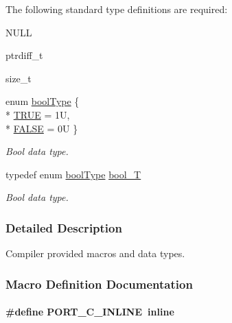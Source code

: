 The following standard type definitions are required\-:
\begin{DoxyItemize}
\item N\-U\-L\-L
\item ptrdiff\-\_\-t
\item size\-\_\-t 
\end{DoxyItemize}\begin{DoxyCompactItemize}
\item 
enum \hyperlink{group__template__compiler_ga05f6c3f21a0d28271ad754637673d8fa}{bool\-Type} \{ \\*
\hyperlink{group__template__compiler_gga05f6c3f21a0d28271ad754637673d8faaa82764c3079aea4e60c80e45befbb839}{T\-R\-U\-E} = 1\-U, 
\\*
\hyperlink{group__template__compiler_gga05f6c3f21a0d28271ad754637673d8faaa1e095cc966dbecf6a0d8aad75348d1a}{F\-A\-L\-S\-E} = 0\-U
 \}
\begin{DoxyCompactList}\small\item\em Bool data type. \end{DoxyCompactList}\item 
typedef enum \hyperlink{group__template__compiler_ga05f6c3f21a0d28271ad754637673d8fa}{bool\-Type} \hyperlink{group__template__compiler_ga74fbee312f9185efb602f89d21b53404}{bool\-\_\-\-T}
\begin{DoxyCompactList}\small\item\em Bool data type. \end{DoxyCompactList}\end{DoxyCompactItemize}


\subsubsection{Detailed Description}
Compiler provided macros and data types. 

\subsubsection{Macro Definition Documentation}
\hypertarget{group__template__compiler_ga87952d6e574c7f437503926e833ba345}{
\paragraph[{P\-O\-R\-T\-\_\-\-C\-\_\-\-I\-N\-L\-I\-N\-E}]{\setlength{\rightskip}{0pt plus 5cm}\#define P\-O\-R\-T\-\_\-\-C\-\_\-\-I\-N\-L\-I\-N\-E~inline}}\label{group__template__compiler_ga87952d6e574c7f437503926e833ba345}


